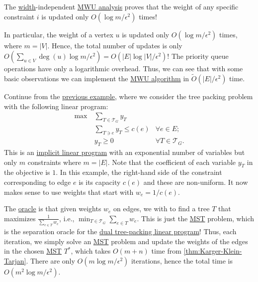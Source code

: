 \begin{eg}
	\begin{prev}
		The \hyperref[def:width]{width}-independent \hyperref[thm:MWU-discrete-non-uniform]{MWU analysis} proves that the weight of any specific constraint \(i\) is updated only \(O(\log m / \epsilon ^2)\) times!
	\end{prev}

	In particular, the weight of a vertex \(u\) is updated only \(O(\log m / \epsilon ^2)\) times, where \(m = \lvert V \rvert \). Hence, the total number of updates is only \(O(\sum_{u \in V} \deg(u) \log m / \epsilon ^2) = O(\lvert E \rvert \log \lvert V \rvert / \epsilon ^2)\)! The priority queue operations have only a logarithmic overhead. Thus, we can see that with some basic observations we can implement the \hyperref[algo:MWU-discrete-non-uniform]{MWU algorithm} in \(\widetilde{O} (\lvert E \rvert / \epsilon ^2)\) time.
\end{eg}

\begin{eg}\label{eg:tree-packing-MWU-implementation}
	Continue from the \hyperref[eg:tree-packing-MWU]{previous example}, where we consider the tree packing problem with the following linear program:
	\[
		\begin{aligned}
			\max~ & \sum_{T \in \mathcal{T} _G} y_T                                 \\
			      & \sum_{T \ni e} y_T \leq c(e)    & \forall e \in E ;             \\
			      & y_T \geq 0                      & \forall T \in \mathcal{T} _G.
		\end{aligned}
	\]
	This is an \hyperref[def:implicit-LP]{implicit linear program} with an exponential number of variables but only \(m\) constraints where \(m = \lvert E \rvert \). Note that the coefficient of each variable \(y_T\) in the objective is \(1\). In this example, the right-hand side of the constraint corresponding to edge \(e\) is its capacity \(c(e)\) and these are non-uniform. It now makes sense to use weights that start with \(w_e = 1 / c(e)\).

	The \hyperref[eq:MWU-oracle-LP]{oracle} is that given weights \(w_e\) on edges, we with to find a tree \(T\) that maximizes \(\frac{1}{\sum_{e \in T} w_e}\), i.e., \(\min _{T \in \mathcal{T} _G} \sum_{e \in T} w_e\). This is just the \hyperref[prb:MST]{MST} problem, which is the separation oracle for the \hyperref[eq:tree-packing-LP]{dual tree-packing linear program}! Thus, each iteration, we simply solve an \hyperref[prb:MST]{MST} problem and update the weights of the edges in the chosen \hyperref[prb:MST]{MST} \(T^{\ast} \), which takes \(O(m + n)\) time from \autoref{thm:Karger-Klein-Tarjan}. There are only \(O(m \log m / \epsilon ^2)\) iterations, hence the total time is \(O(m^2 \log m / \epsilon ^2)\).
\end{eg}


